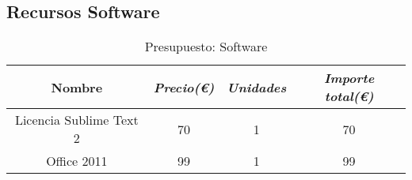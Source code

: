 \subsection{Recursos Software}

\begin{table}[htp]
	\centering
	\caption{Presupuesto: Software}\label{tab:budget-software}
	\begin{tabular}{cccc}
		\toprule
    	\textbf{Nombre} & \emph{Precio(\euro)} & \emph{Unidades} & \emph{Importe total(\euro)}\\
    	\midrule
    	Licencia Sublime Text 2		& 	70				&	1 			& 	70\\
    	Office 2011 				&	99				&	1			&	99\\
    	\bottomrule
    \end{tabular}
\end{table}